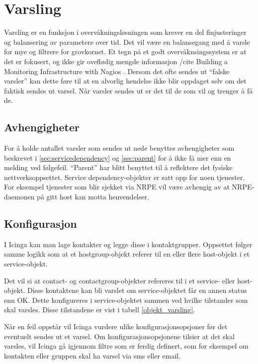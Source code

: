\section{Varsling}
Varsling er en funksjon i overvåkningsløsningen som krever en del finjusteringer og balansering av parametere over tid. Det vil være en balansegang med å varsle for mye og filtrere for grovkornet. Et tegn på et godt overvåknsingssystem er at det er fokusert, og ikke gir oveflødig mengde informasjon /cite  Building a Monitoring Infrastructure with Nagios . Dersom det ofte sendes ut “falske varsler” kan dette føre til at en alvorlig hendelse ikke blir oppdaget selv om det faktisk sendes ut varsel. Når varsler sendes ut er det til de som vil og trenger å få de.

\subsection{Avhengigheter}
For å holde antallet varsler som sendes ut nede benyttes avhengigheter som beskrevet i \ref{sec:servicedependency}  og \ref{sec:parent} for å ikke få mer enn en melding ved følgefeil. “Parent” har blitt benyttet til å reflektere det fysiske nettverksoppsettet. Service dependency-objekter er satt opp for noen tjenester. For eksempel tjenester som blir sjekket via NRPE vil være avhengig av at NRPE-daemonen på gitt host kan motta henvendelser.

\subsection{Konfigurasjon}
I Icinga kan man lage kontakter og legge disse i kontaktgrupper. Oppsettet følger samme logikk som at et hostgroup-objekt referer til en eller flere host-objekt i et service-objekt.

Det vil si at contact- og contactgroup-objekter refereres til i et service- eller host-objekt. Disse kontaktene kan bli varslet om service-objektet får en annen status enn OK. Dette konfigureres i service-objektet sammen ved hvilke tilstander som skal varsles. Disse tilstandene er vist i tabell \ref{objekt_varsling}.

Når en feil oppstår vil Icinga vurdere ulike konfigurasjonsopsjoner før det eventuelt sendes ut et varsel. Om konfigurasjonsopsjonene tilsier at det skal varsles, vil Icinga gå igjennom filtre som er ferdig definert, som for eksempel om kontakten eller gruppen skal ha varsel via sms eller email. 

